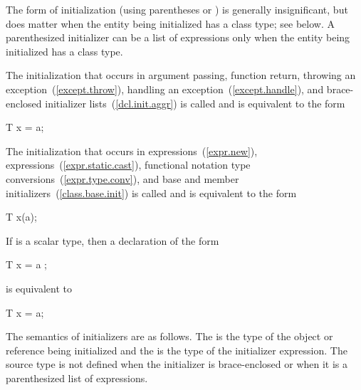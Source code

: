 \pnum
The form of initialization (using parentheses or
\tcode{=})
is generally insignificant, but does matter when the entity
being initialized has a class type; see below.
A parenthesized initializer can be a list of expressions
only when the entity being initialized has a class type.

\pnum
{}%
%
The initialization that occurs in argument passing, function return,
throwing an exception~(\ref{except.throw}), handling an
exception~(\ref{except.handle}), and brace-enclosed initializer
lists~(\ref{dcl.init.aggr}) is called 
and is equivalent to the form

\begin{codeblock}
T x = a;
\end{codeblock}

The initialization that occurs in  expressions~(\ref{expr.new}),
 expressions~(\ref{expr.static.cast}), functional
notation type conversions~(\ref{expr.type.conv}), and base and member
initializers~(\ref{class.base.init}) is called 
and is equivalent to the form

\begin{codeblock}
T x(a);
\end{codeblock}

\pnum
If  is a scalar type, then a declaration of the form

\begin{codeblock}
T x = { a };
\end{codeblock}

is equivalent to

\begin{codeblock}
T x = a;
\end{codeblock}

\pnum
The semantics of initializers are as follows.
The
%
is the type of the object or reference being initialized and the
is the type of the initializer expression.
The source type is not defined when the initializer is brace-enclosed or
when it is a parenthesized list of expressions.

